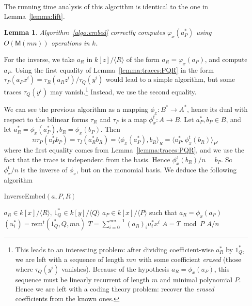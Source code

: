 \documentclass[12pt]{article}
\def\M {\ensuremath{\mathsf{M}}}
\def\rem {\ensuremath{\mathrm{rem}}}
\newcommand{\ang}[1]{\langle#1\rangle}
\newtheorem{Lemma}{Lemma}
\begin{document}
The running time analysis of this algorithm is identical to the one in
Lemma~\ref{lemma:lift}.

\begin{Lemma}\label{lemma:algo:embed}
  Algorithm~\ref{algo:embed} correctly computes $\varphi_x(a_P^\ast)$
  using $O(\M(mn))$ operations in $k$.
\end{Lemma}


For the inverse, we take $a_R$ in $k[z]/\langle R \rangle$ of the form
$a_R=\varphi_x(a_P)$, and compute $a_P$. Using the first equality of
Lemma~\ref{lemma:traces:PQR} in the form $\tau_P(a_P x^i) =\tau_R(a_R
z^i)/\tau_Q(y^i)$ would lead to a simple algorithm, but some traces
$\tau_Q(y^i)$ may vanish.\footnote{This leads to an interesting
  problem: after dividing coefficient-wise $a_R^\ast$ by $1_Q^\ast$,
  we are left with a sequence of length $mn$ with some coefficient
  \emph{erased} (those where $\tau_Q(y^i)$ vanishes). Because of the
  hypothesis $a_R=\phi_x(a_P)$, this sequence must be linearly
  recurrent of length $m$ and minimal polynomial $P$. Hence we are
  left with a coding theory problem: recover the \emph{erased}
  coefficients from the known ones.}  Instead, we use the second
equality.

We can see the previous algorithm as a mapping $\phi_x:B^\ast\to
A^\ast$, hence its dual with respect to the bilinear forms $\tau_R$
and $\tau_P$ is a map $\phi_x^t:A\to B$. Let $a_P^\ast,b_P\in B$, and
let $a_R^\ast=\phi_x(a_P^\ast), b_R=\phi_x(b_P)$. Then
\begin{equation}
  n\tau_P(a_P^\ast b_P) = \tau_I(a_R^\ast b_R) = \ang{\phi_x(a_P^\ast),b_R}_R = \ang{a_P^\ast,\phi_x^t(b_R)}_P,
\end{equation}
where the first equality comes from Lemma~\ref{lemma:traces:PQR}, and
we use the fact that the trace is independent from the basis. Hence
$\phi_x^t(b_R)/n = b_P$. So $\phi_x^t/n$ is the inverse of $\phi_x$,
but on the monomial basis. We deduce the following algorithm

\begin{algorithm}[H]
  \caption{InverseEmbed$(a,P,R)$}
  \begin{algorithmic}[1]
    \REQUIRE $a_R\in k[x]/\ang{R}$, $1_Q^\ast\in k[y]/\ang{Q}$
    \ENSURE $a_P\in k[x]/\ang{P}$ such that $a_R=\phi_x(a_P)$
    \STATE $(u_i^\ast) = \rem^t(1_Q^\ast,Q,mn)$
    \STATE $T = \sum_{i=0}^{mn-1} (a_R)_i u_i^\ast x^i$
    \STATE $A = T \bmod P$
    \RETURN $A/n$
  \end{algorithmic}\label{algo:inverseEmbed}
\end{algorithm}
\end{document}
